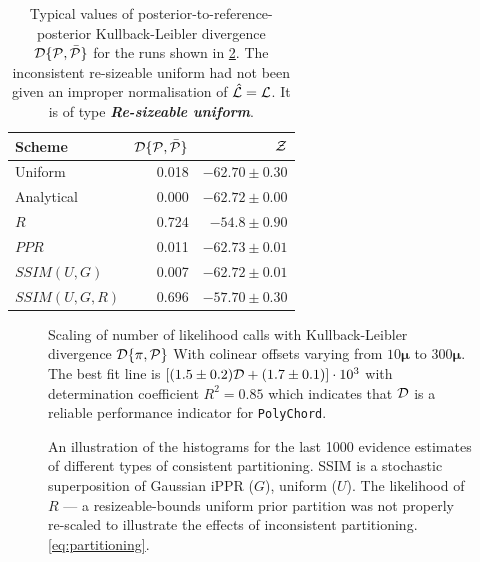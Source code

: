 \documentclass[usenatbib]{mnras}
\begin{document}
\begin{table}
  \centering
  
  \caption{Typical values of posterior-to-reference-posterior
    Kullback-Leibler divergence ${\cal D}\{{\cal P}, \bar{\cal P}\}$
    for the runs shown in \cref{fig:hist}. The inconsistent
    re-sizeable uniform had not been given an improper normalisation
    of $\hat{\cal L} = {\cal L}$. It is of type \textbf{\emph{Re-sizeable
        uniform}}.}
  \begin{tabular}{lrr}
    \textbf{Scheme} & ${\cal D}\{ {\cal P}, \bar{\cal P}\}$ & ${\cal Z}$\\
    \hline
    Uniform & 0.018 & \(-62.70 \pm 0.30\)\\
    Analytical & 0.000 & \(-62.72 \pm 0.00\) \\
    $R$ & 0.724 & \(-54.8 \pm 0.90\)\\
    $PPR$ & 0.011 & \(-62.73 \pm 0.01\)\\
    $SSIM(U, G)$ & 0.007 & \(-62.72 \pm 0.01\)\\
    $SSIM(U, G, R)$ & 0.696 & \(-57.70 \pm 0.30\)\\
  \end{tabular}
  \label{tab:hist}
\end{table}


\begin{figure}
  
  \caption{Scaling of number of likelihood calls with Kullback-Leibler
    divergence \({\cal D}\{ \pi, {\cal P}\}\) With colinear offsets
    varying from $10\bm{\mu}$ to $300\bm{\mu}$. The best fit line is
    \(\left[(1.5 \pm 0.2) {\cal D} + (1.7 \pm 0.1)\right]\cdot 10^3 \)
    with determination coefficient \(R^{2} = 0.85\) which indicates
    that \({\cal D}\) is a reliable performance indicator for
    \texttt{PolyChord}.\label{fig:kl-scaling}}
\end{figure}


\begin{figure}

\caption{An illustration of the histograms for the last 1000 evidence
  estimates of different types of consistent partitioning. SSIM is a
  stochastic superposition of Gaussian iPPR (\(G\)), uniform
  (\(U\)). The likelihood of \(R\) --- a resizeable-bounds uniform
  prior partition was not properly re-scaled to illustrate the effects
  of inconsistent partitioning.
  \cref{eq:partitioning}. \label{fig:hist}}
\end{figure}
\end{document}
